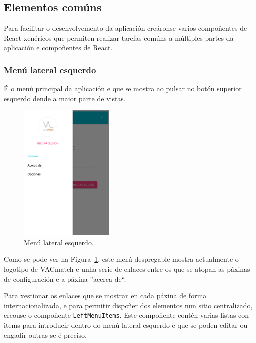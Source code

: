     \subsection{Elementos comúns}
    Para facilitar o desenvolvemento da aplicación creáronse varios 
compoñentes de React xenéricos que permiten realizar tarefas comúns a múltiples 
partes da aplicación e compoñentes de React.

      \subsubsection{Menú lateral esquerdo}
      É o menú principal da aplicación e que se mostra ao pulsar no botón 
superior esquerdo dende a maior parte de vistas.

      \begin{figure}[h!]
        \begin{center}
        \includegraphics[width=0.4\textwidth]{./img/demo/1_left_menu.png}
        \caption{Menú lateral esquerdo.}
        \label{fig:design:leftmenu}
        \end{center}
      \end{figure}

      Como se pode ver na Figura~\ref{fig:design:leftmenu}, este 
menú despregable mostra actualmente o logotipo de VACmatch e unha 
serie de enlaces entre os que se atopan as páxinas de configuración e a páxina 
''acerca de``.

      Para xestionar os enlaces que se mostran en cada páxina de forma 
internacionalizada, e para permitir dispoñer dos elementos nun sitio 
centralizado, creouse o compoñente \lstinline{LeftMenuItems}.
      Este compoñente contén varias listas con items para introducir dentro do 
menú lateral esquerdo e que se poden editar ou engadir outras se é 
preciso.

